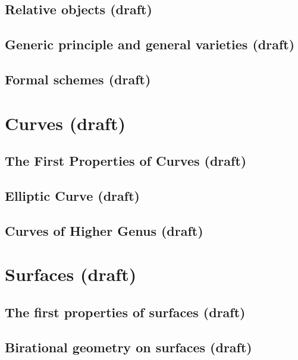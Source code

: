 \documentclass[sectionlevel=book]{noteformyself}
\begin{document}
        \section{Relative objects (draft)}
        
        \section{Generic principle and general varieties (draft)}
        
        \section{Formal schemes (draft)}
        

    \chapter{Curves (draft)}
        \section{The First Properties of Curves (draft)}
        
        \section{Elliptic Curve (draft)}
        
        \section{Curves of Higher Genus (draft)}
        

    \chapter{Surfaces (draft)}
        \section{The first properties of surfaces (draft)}
        
        \section{Birational geometry on surfaces (draft)}
        
\end{document}
